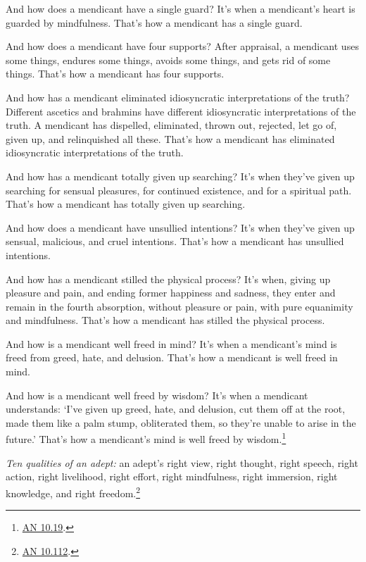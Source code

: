\documentclass[12pt,openany]{book}%
\begin{document}
And how does a mendicant have a single guard? It’s when a mendicant’s heart is guarded by mindfulness. That’s how a mendicant has a single guard. 

And how does a mendicant have four supports? After appraisal, a mendicant uses some things, endures some things, avoids some things, and gets rid of some things. That’s how a mendicant has four supports. 

And how has a mendicant eliminated idiosyncratic interpretations of the truth? Different ascetics and brahmins have different idiosyncratic interpretations of the truth. A mendicant has dispelled, eliminated, thrown out, rejected, let go of, given up, and relinquished all these. That’s how a mendicant has eliminated idiosyncratic interpretations of the truth. 

And how has a mendicant totally given up searching? It’s when they’ve given up searching for sensual pleasures, for continued existence, and for a spiritual path. That’s how a mendicant has totally given up searching. 

And how does a mendicant have unsullied intentions? It’s when they’ve given up sensual, malicious, and cruel intentions. That’s how a mendicant has unsullied intentions. 

And how has a mendicant stilled the physical process? It’s when, giving up pleasure and pain, and ending former happiness and sadness, they enter and remain in the fourth absorption, without pleasure or pain, with pure equanimity and mindfulness. That’s how a mendicant has stilled the physical process. 

And how is a mendicant well freed in mind? It’s when a mendicant’s mind is freed from greed, hate, and delusion. That’s how a mendicant is well freed in mind. 

And how is a mendicant well freed by wisdom? It’s when a mendicant understands: ‘I’ve given up greed, hate, and delusion, cut them off at the root, made them like a palm stump, obliterated them, so they’re unable to arise in the future.’ That’s how a mendicant’s mind is well freed by wisdom.\footnote{\href{https://suttacentral.net/an10.19/en/sujato}{AN 10.19}. } 

\emph{Ten qualities of an adept:} an adept’s right view, right thought, right speech, right action, right livelihood, right effort, right mindfulness, right immersion, right knowledge, and right freedom.\footnote{\href{https://suttacentral.net/an10.112/en/sujato}{AN 10.112}. } 
\end{document}
